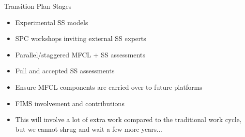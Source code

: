 \documentclass[aspectratio=169]{beamer}
\begin{document}

\begin{frame}{Transition Plan Stages}\fns
  \begin{itemize}
    \item[] Experimental SS models\\[4ex]
    \item[] SPC workshops inviting external SS experts\\[4ex]
    \item[] Parallel/staggered MFCL + SS assessments\\[4ex]
    \item[] Full and accepted SS assessments\\[4ex]
    \item[] Ensure MFCL components are carried over to future platforms\\[4ex]
    \item[] FIMS involvement and contributions\\[4ex]
    \item[] This will involve a lot of extra work compared to the traditional
    work cycle,\\
    but we cannot shrug and wait a few more years...
  \end{itemize}
\end{frame}
\end{document}
